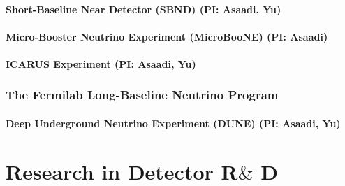 \documentclass[11pt]{article}
\def\overhead#1{\part{#1}}
\def\onehead#1{\section{#1}}
\def\twohead#1{\subsection{#1}}
\begin{document}
\twohead{Short-Baseline Near Detector (SBND) (PI: Asaadi, Yu)}


\twohead{Micro-Booster Neutrino Experiment (MicroBooNE) (PI: Asaadi)}



\twohead{ICARUS Experiment (PI: Asaadi, Yu)}


\onehead{The Fermilab Long-Baseline Neutrino Program}



\twohead{Deep Underground Neutrino Experiment (DUNE) (PI: Asaadi, Yu)}



\newpage

\overhead{Research in Detector R$\&$ D}









%

\newpage
\end{document}
